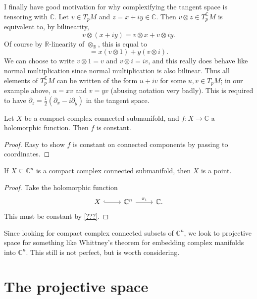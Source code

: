 
\begin{remark}
	I finally have good motivation for why complexifying the tangent space is tensoring with $\mathbb{C} $. Let $v\in T_pM$ and $z=x+iy\in\mathbb{C} $. Then $v\otimes z\in T_p^\mathbb{C} M$ is equivalent to, by bilinearity,
	\[
		v\otimes (x+iy)=v\otimes x + v\otimes iy
	.\]
	Of course by $\mathbb{R} $-linearity of $\otimes _\mathbb{R} $, this is equal to
	\[
		=x(v\otimes 1)+y(v\otimes i)
	.\]
	We can choose to write $v\otimes 1=v$ and $v\otimes i=iv$, and this really does behave like normal multiplication since normal multiplication is also bilinear. Thus all elements of $T_p^\mathbb{C} M$ can be written of the form $u+iv$ for some $u,v\in T_pM$; in our example above, $u=xv$ and $v=yv$ (abusing notation very badly). This is required to have $\partial _z=\frac{1}{2} (\partial _x -i \partial _y)$ in the tangent space.
\end{remark}

\begin{proposition}\label{???}
	Let $X$ be a compact complex connected submanifold, and $f : X \to \mathbb{C} $ a holomorphic function. Then $f$ is constant.
\end{proposition}
\begin{proof}
	Easy to show $f$ is constant on connected components by passing to coordinates.
\end{proof}
\begin{corollary}\label{????}
	If $X\subseteq \mathbb{C} ^n$ is a compact complex connected submanifold, then $X$ is a point.
\end{corollary}
\begin{proof}
	Take the holomorphic function
	\[\begin{tikzcd}[row sep = 2.5em, column sep = 2.5em]
	X \ar[hook, r]  & \mathbb{C} ^n \ar[" \pi _i ", r]  & \mathbb{C} .
	\end{tikzcd}\]
	This must be constant by \cref{???}.
\end{proof}

Since looking for compact complex connected subsets of $\mathbb{C} ^n$, we look to projective space for something like Whittney's theorem for embedding complex manifolds into $\mathbb{C} ^n$. This still is not perfect, but is worth considering.

\section{The projective space}


